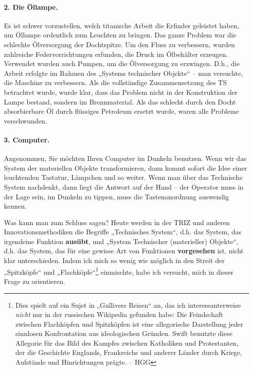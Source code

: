 \documentclass[11pt,a4paper]{article}
\begin{document}
\paragraph{2. Die Öllampe.}
Es ist schwer vorzustellen, welch titanische Arbeit die Erfinder geleistet
haben, um Öllampe ordentlich zum Leuchten zu bringen. Das ganze Problem war
die schlechte Ölversorgung der Dochtspitze. Um den Fluss zu verbessern, wurden
zahlreiche Federvorrichtungen erfunden, die Druck im Ölbehälter erzeugen.
Verwendet wurden auch Pumpen, um die Ölversorgung zu erzwingen. D.h., die
Arbeit erfolgte im Rahmen des „Systems technischer Objekte“ -- man versuchte,
die Maschine zu verbessern.  Als die vollständige Zusammensetzung des TS
betrachtet wurde, wurde klar, dass das Problem nicht in der Konstruktion der
Lampe bestand, sondern im Brennmaterial.  Als das schlecht durch den Docht
absorbierbare Öl durch flüssiges Petroleum ersetzt wurde, waren alle Probleme
verschwunden.

\paragraph{3. Computer.}
Angenommen, Sie möchten Ihren Computer im Dunkeln benutzen. Wenn wir das
System der materiellen Objekte transformieren, dann kommt sofort die Idee
einer leuchtenden Tastatur, Lämpchen und so weiter. Wenn man über das
Technische System nachdenkt, dann liegt die Antwort auf der Hand -- der
Operator muss in der Lage sein, im Dunkeln zu tippen, muss die Tastenanordnung
auswendig kennen.

Was kann man zum Schluss sagen? Heute werden in der TRIZ und anderen
Innovationsmethodiken die Begriffe „Technisches System“, d.h. das System, das
irgendeine Funktion \textbf{ausübt}, und „System Technischer (materieller)
Objekte“, d.h. das System, das für eine gewisse Art von Funktionen
\textbf{vorgesehen} ist, nicht klar unterschieden. Indem ich mich so wenig wie
möglich in den Streit der „Spitzköpfe“ und „Flachköpfe“\footnote{Dies spielt
  auf ein Sujet in „Gullivers Reisen“ an, das ich interessanterweise
  \emph{nicht} nur in der russischen Wikipedia gefunden habe: Die Feindschaft
  zwischen Flachköpfen und Spitzköpfen ist eine allegorische Darstellung jeder
  sinnlosen Konfrontation aus ideologischen Gründen. Swift benutzte diese
  Allegorie für das Bild des Kampfes zwischen Katholiken und Protestanten, der
  die Geschichte Englands, Frankreichs und anderer Länder durch Kriege,
  Aufstände und Hinrichtungen prägte. -- HGG} einmischte, habe ich versucht,
mich in dieser Frage zu orientieren.
\end{document}
